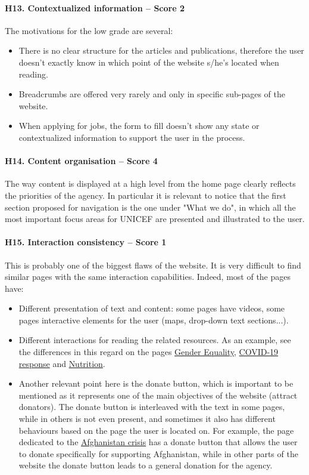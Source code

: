 \paragraph*{H13. Contextualized information – Score 2}
The motivations for the low grade are several:
\begin{itemize}
	\item There is no clear structure for the articles and publications, therefore the user doesn't exactly know in which point of the website s/he's located when reading.
	\item Breadcrumbs are offered very rarely and only in specific sub-pages of the website.
	\item When applying for jobs, the form to fill doesn't show any state or contextualized information to support the user in the process.
\end{itemize}


\paragraph*{H14. Content organisation  – Score 4}
The way content is displayed at a high level from the home page clearly reflects the priorities of the agency. In particular it is relevant to notice that the first section proposed for navigation is the one under "What we do", in which all the most important focus areas for UNICEF are presented and illustrated to the user.



\paragraph*{H15. Interaction consistency – Score 1}
This is probably one of the biggest flaws of the website. It is very difficult to find similar pages with the same interaction capabilities. Indeed, most of the pages have:
\begin{itemize}
	\item Different presentation of text and content: some pages have videos, some pages interactive elements for the user (maps, drop-down text sections...).
	\item Different interactions for reading the related resources. As an example, see the differences in this regard on the pages \href{https://www.unicef.org/gender-equality}{Gender Equality}, \href{https://www.unicef.org/coronavirus/covid-19}{COVID-19 response} and \href{https://www.unicef.org/nutrition}{Nutrition}.
	\item Another relevant point here is the donate button, which is important to be mentioned as it represents one of the main objectives of the website (attract donators). The donate button is interleaved with the text in some pages, while in others is not even present, and sometimes it also has different behaviours based on the page the user is located on. For example, the page dedicated to the \href{https://www.unicef.org/emergencies/delivering-support-afghanistans-children}{Afghanistan crisis} has a donate button that allows the user to donate specifically for supporting Afghanistan, while in other parts of the website the donate button leads to a general donation for the agency.
\end{itemize}

